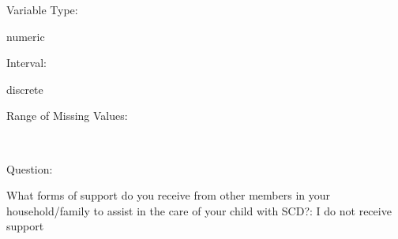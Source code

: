 \documentclass[
]{article}
\begin{document}
\begin{minipage}[t]{0.3\linewidth}

Variable Type:

\end{minipage}%
\begin{minipage}[t]{0.7\linewidth}

numeric

\end{minipage}

\begin{minipage}[t]{0.3\linewidth}

Interval:

\end{minipage}%
\begin{minipage}[t]{0.7\linewidth}

discrete

\end{minipage}

\begin{minipage}[t]{0.3\linewidth}

Range of Missing Values:

\end{minipage}%
\begin{minipage}[t]{0.7\linewidth}

~

\end{minipage}

\begin{minipage}[t]{0.3\linewidth}

Question:

\end{minipage}%
\begin{minipage}[t]{0.7\linewidth}

What forms of support do you receive from other members in your
household/family to assist in the care of your child with SCD?: I do not
receive support

\end{minipage}
\end{document}
